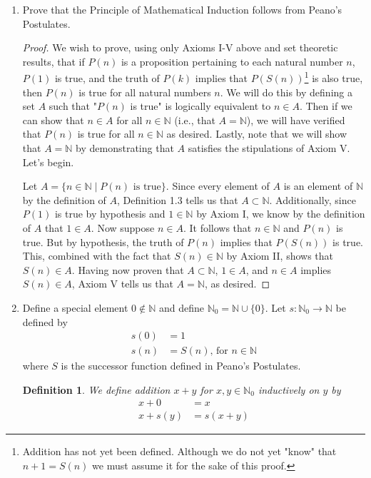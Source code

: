 \documentclass[titlepage]{article}
\newtheorem*{definition*}{Definition}
\theoremstyle{definition}
\newcommand{\N}{\mathbb{N}}
\begin{document}
\begin{enumerate}
\begin{enumerate}[label={(\alph*)}]
\begin{proof}
        \end{proof}
        \item Prove that the Principle of Mathematical Induction follows from Peano's Postulates.
        \begin{proof}
            We wish to prove, using only Axioms I-V above and set theoretic results, that if $P(n)$ is a proposition pertaining to each natural number $n$, $P(1)$ is true, and the truth of $P(k)$ implies that $P(S(n))$\footnote{Addition has not yet been defined. Although we do not yet "know" that $n+1=S(n)$ we must assume it for the sake of this proof.} is also true, then $P(n)$ is true for all natural numbers $n$. We will do this by defining a set $A$ such that "$P(n)$ is true" is logically equivalent to $n\in A$. Then if we can show that $n\in A$ for all $n\in\N$ (i.e., that $A=\N$), we will have verified that $P(n)$ is true for all $n\in\N$ as desired. Lastly, note that we will show that $A=\N$ by demonstrating that $A$ satisfies the stipulations of Axiom V. Let's begin.\par
            Let $A=\{n\in\N\mid P(n)\text{ is true}\}$. Since every element of $A$ is an element of $\N$ by the definition of $A$, Definition 1.3 tells us that $A\subset\N$. Additionally, since $P(1)$ is true by hypothesis and $1\in\N$ by Axiom I, we know by the definition of $A$ that $1\in A$. Now suppose $n\in A$. It follows that $n\in\N$ and $P(n)$ is true. But by hypothesis, the truth of $P(n)$ implies that $P(S(n))$ is true. This, combined with the fact that $S(n)\in\N$ by Axiom II, shows that $S(n)\in A$. Having now proven that $A\subset\N$, $1\in A$, and $n\in A$ implies $S(n)\in A$, Axiom V tells us that $A=\N$, as desired.
        \end{proof}
        \item Define a special element $0\notin\N$ and define $\N_0=\N\cup\{0\}$. Let $s:\N_0\to\N$ be defined by
        \begin{align*}
            s(0) &= 1\\
            s(n) &= S(n)\text{, for }n\in\N
        \end{align*}
        where $S$ is the successor function defined in Peano's Postulates.
        \begin{definition*}
            We define addition $x+y$ for $x,y\in\N_0$ inductively on $y$ by
            \begin{align*}
                x+0 &= x\\
                x+s(y) &= s(x+y)
            \end{align*}

\end{definition*}
\end{enumerate}
\end{enumerate}
\end{document}
